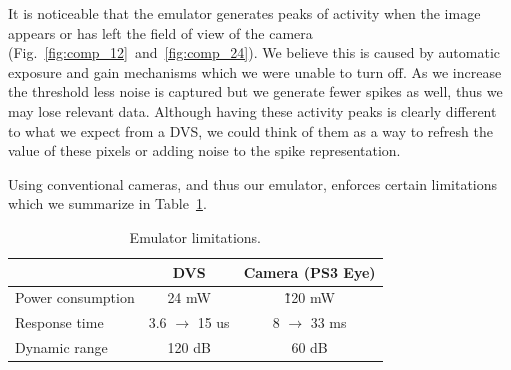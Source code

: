 \documentclass[conference]{IEEEtran}
\begin{document}
It is noticeable that the emulator generates peaks of activity when the image appears or has left the field of view of the camera (Fig.~\ref{fig:comp_12}~and~\ref{fig:comp_24}). We believe this is caused by automatic exposure and gain mechanisms which we were unable to turn off. As we increase the threshold less noise is captured but we generate fewer spikes as well, thus we may lose relevant data. Although having these activity peaks is clearly different to what we expect from a DVS, we could think of them as a way to refresh the value of these pixels or adding noise to the spike representation.

Using conventional cameras, and thus our emulator, enforces certain limitations which we summarize in Table~\ref{tb:constraints}.

\begin{table}[hbt]
  \centering
  \caption{Emulator limitations.}
  \label{tb:constraints}
  \begin{tabular}{l c c}
    & DVS & Camera (PS3 Eye) \\ 
    \hline
    \rule{0pt}{0.4cm}Power consumption & 24 mW & \~120 mW\\
    Response time & 3.6 $\rightarrow$ 15 us & 8 $\rightarrow$ 33 ms \\
    Dynamic range & 120 dB & 60 dB\\
  \end{tabular}

\end{table}
\end{document}
